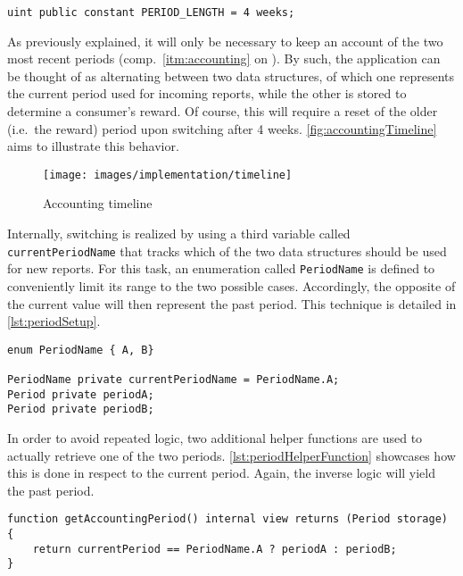 \begin{lstlisting}[caption=Definition of period length, label=lst:periodDataStructure]
uint public constant PERIOD_LENGTH = 4 weeks;
\end{lstlisting}

As previously explained, it will only be necessary to keep an account of the two most recent periods (comp.~\ref{itm:accounting} on ). By such, the application can be thought of as alternating between two data structures, of which one represents the current period used for incoming reports, while the other is stored to determine a consumer's reward. Of course, this will require a reset of the older (i.e.~the reward) period upon switching after 4 weeks. \autoref{fig:accountingTimeline} aims to illustrate this behavior. 

\begin{figure}[hbt]
	  \texttt{[image: images/implementation/timeline]}
	  \caption{Accounting timeline}
	  \label{fig:accountingTimeline}
\end{figure}

\FloatBarrier

Internally, switching is realized by using a third variable called \texttt{currentPeriodName} that tracks which of the two data structures should be used for new reports. For this task, an enumeration called \texttt{PeriodName} is defined to conveniently limit its range to the two possible cases. Accordingly, the opposite of the current value will then represent the past period. This technique is detailed in \autoref{lst:periodSetup}. 

\begin{lstlisting}[language=Solidity, caption=Declaration of periods and definition of current period tracker, label=lst:periodSetup]
enum PeriodName { A, B}

PeriodName private currentPeriodName = PeriodName.A;
Period private periodA;
Period private periodB;
\end{lstlisting}

In order to avoid repeated logic, two additional helper functions are used to actually retrieve one of the two periods.  \autoref{lst:periodHelperFunction} showcases how this is done in respect to the current period. Again, the inverse logic will yield the past period. 

\begin{lstlisting}[language=Solidity, caption=Helper function to retrieve current period, label=lst:periodHelperFunction]
function getAccountingPeriod() internal view returns (Period storage) {
	return currentPeriod == PeriodName.A ? periodA : periodB;
}
\end{lstlisting}
 
